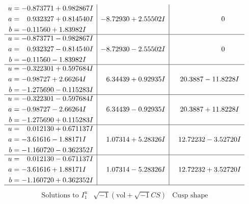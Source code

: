 \documentclass[1p]{elsarticle_modified}
\theoremstyle{definition}
\newcommand{\I}{\sqrt{-1}}
\begin{document}
$$\begin{array}{c|c|c}
\begin{aligned}
u &= -0.873771 + 0.982867 I \\
a &= \phantom{-}0.932327 + 0.814540 I \\
b &= -0.11560 + 1.83982 I\end{aligned}
 & -8.72930 + 2.55502 I & \phantom{-0.000000 } 0 \\ \hline\begin{aligned}
u &= -0.873771 - 0.982867 I \\
a &= \phantom{-}0.932327 - 0.814540 I \\
b &= -0.11560 - 1.83982 I\end{aligned}
 & -8.72930 - 2.55502 I & \phantom{-0.000000 } 0 \\ \hline\begin{aligned}
u &= -0.322301 + 0.597684 I \\
a &= -0.98727 + 2.66264 I \\
b &= -1.275690 - 0.115283 I\end{aligned}
 & \phantom{-}6.34439 + 0.92935 I & \phantom{-}20.3887 - 11.8228 I \\ \hline\begin{aligned}
u &= -0.322301 - 0.597684 I \\
a &= -0.98727 - 2.66264 I \\
b &= -1.275690 + 0.115283 I\end{aligned}
 & \phantom{-}6.34439 - 0.92935 I & \phantom{-}20.3887 + 11.8228 I \\ \hline\begin{aligned}
u &= \phantom{-}0.012130 + 0.671137 I \\
a &= -3.61616 - 1.88171 I \\
b &= -1.160720 - 0.362352 I\end{aligned}
 & \phantom{-}1.07314 + 5.28326 I & \phantom{-}12.72232 - 3.52720 I \\ \hline\begin{aligned}
u &= \phantom{-}0.012130 - 0.671137 I \\
a &= -3.61616 + 1.88171 I \\
b &= -1.160720 + 0.362352 I\end{aligned}
 & \phantom{-}1.07314 - 5.28326 I & \phantom{-}12.72232 + 3.52720 I\\
 \hline 
 \end{array}$$\newpage$$\begin{array}{c|c|c}  
\text{Solutions to }I^u_{1}& \I (\text{vol} + \sqrt{-1}CS) & \text{Cusp shape}\\
 \hline 
\begin{aligned}

\end{aligned}
\end{array}$$
\end{document}
